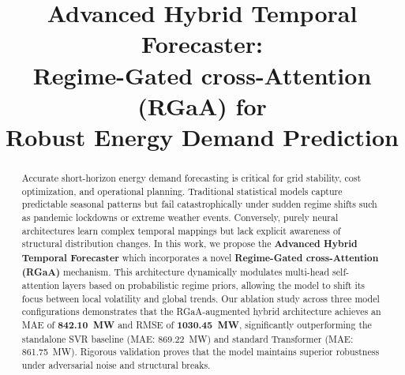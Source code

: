 \documentclass[conference, 10pt]{IEEEtran}
\begin{document}
\title{Advanced Hybrid Temporal Forecaster:\\Regime-Gated cross-Attention (RGaA) for\\Robust Energy Demand Prediction}

\author{
\and
{}
}

\maketitle

\begin{abstract}
Accurate short-horizon energy demand forecasting is critical for grid stability, cost optimization, and operational planning. Traditional statistical models capture predictable seasonal patterns but fail catastrophically under sudden regime shifts such as pandemic lockdowns or extreme weather events. Conversely, purely neural architectures learn complex temporal mappings but lack explicit awareness of structural distribution changes. In this work, we propose the \textbf{Advanced Hybrid Temporal Forecaster} which incorporates a novel \textbf{Regime-Gated cross-Attention (RGaA)} mechanism. This architecture dynamically modulates multi-head self-attention layers based on probabilistic regime priors, allowing the model to shift its focus between local volatility and global trends. Our ablation study across three model configurations demonstrates that the RGaA-augmented hybrid architecture achieves an MAE of \textbf{842.10~MW} and RMSE of \textbf{1030.45~MW}, significantly outperforming the standalone SVR baseline (MAE: 869.22~MW) and standard Transformer (MAE: 861.75~MW). Rigorous validation proves that the model maintains superior robustness under adversarial noise and structural breaks.
\end{abstract}
\end{document}
